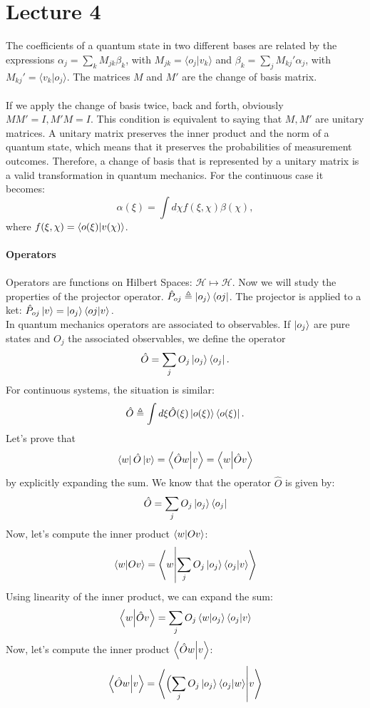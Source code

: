 \documentclass{article}
\begin{document}
\section{Lecture 4}
The coefficients of a quantum state in two different bases are related by the expressions $\alpha_j = \sum_k M_{jk} \beta_k$, with $M_{jk}=\langle o_j \vert v_k \rangle$ and $\beta_k = \sum_j M_{kj}' \alpha_j$, with $M_{kj}' = \langle v_k \vert o_j \rangle$. The matrices $M$ and $M'$ are the change of basis matrix.\\ \\
If we apply the change of basis twice, back and forth, obviously $MM'= I, M'M=I$.
This condition is equivalent to saying that $M,M'$ are unitary matrices. A unitary matrix preserves the inner product and the norm of a quantum state, which means that it preserves the probabilities of measurement outcomes. Therefore, a change of basis that is represented by a unitary matrix is a valid transformation in quantum mechanics.
For the continuous case it becomes:
$$ \alpha(\xi) = \int d\chi f(\xi,\chi) \beta(\chi),$$where  $f(\xi,\chi) = \bra{o(\xi)}\ket{v(\chi)}$.\\ \\
\textbf{Operators} \\ \\
Operators are functions on Hilbert Spaces: $\mathcal{H} \mapsto \mathcal{H}$.
Now we will study the properties of the projector operator.
$\hat{P}_{oj} \triangleq \ket{o_j}\bra{oj}$.
The projector is applied to a ket: $\hat{P}_{oj}\ket{v} =\ket{o_j}\bra{oj}\ket{v}.$ \\
In quantum mechanics operators are associated to observables. If $\ket{o_j}$ are pure states and $O_j$ the associated observables, we define the operator $$\hat{O} = \sum_j O_j \ket{o_j}\bra{o_j}.$$
For continuous systems, the situation is similar:
$$\hat{O} \triangleq \int d\xi \hat{O}(\xi) \ket{o(\xi)}\bra{o(\xi)}.$$
Let's prove that $$\bra{w}  \hat{O}\ket{v}   =\bra{\hat{O}w}\ket{v} = \bra{w}  \ket{\hat{O}v} $$by explicitly expanding the sum. We know that the operator $\hat{O}$ is given by:
$$\hat{O} = \sum_j O_j \ket{o_j}\bra{o_j}$$
Now, let's compute the inner product $\bra{w} \ket{Ov}$:
$$ \bra{w}\ket{Ov}  = \bra{w} \ket{\sum_j O_j \ket{o_j}\bra{o_j} \ket{v}}$$
Using linearity of the inner product, we can expand the sum:
$$ \bra{w}\ket{\hat{O}v}   = \sum_j O_j \bra{w}  \ket{o_j}\bra{o_j} \ket{v}$$
Now, let's compute the inner product $\bra{\hat{O}w}\ket{v}$:
$$\bra{\hat{O}w}\ket{v}= \bra{ \Bigl( \sum_j O_j \ket{o_j}\bra{o_j}  \ket{w} }  \ket{v}$$
\end{document}
